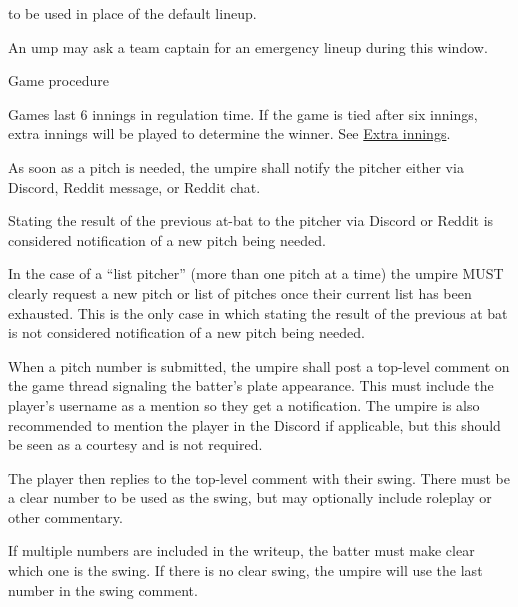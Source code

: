 \begin{deepEnumerate}
\begin{deepEnumerate}
\begin{deepEnumerate}
\begin{deepEnumerate}
				to be used in place of the default lineup.
				\begin{deepEnumerate}
					\item An ump may ask a team captain for an emergency lineup during this window.
				\end{deepEnumerate}
			\end{deepEnumerate}
		\end{deepEnumerate}
	\end{deepEnumerate}
	\item Game procedure
	\begin{deepEnumerate}
		\item Games last 6 innings in regulation time. 
		If the game is tied after six innings, extra innings will be played to determine the winner. 
		See \hyperref[sec:extra innings]{Extra innings}.
		\item As soon as a pitch is needed, the umpire shall notify the pitcher either via Discord, Reddit message, or Reddit chat.
		\begin{deepEnumerate}
			\item Stating the result of the previous at-bat to the pitcher via Discord or Reddit is considered notification of a new 
			pitch being needed.
			\item  In the case of a “list pitcher” (more than one pitch at a time) the umpire MUST clearly request a new pitch or list
			 of pitches once their current list has been exhausted. This is the only case in which stating the result of the previous
			 at bat is not considered notification of a new pitch being needed.
		\end{deepEnumerate}
		\item When a pitch number is submitted, the umpire shall post a top-level comment on the game thread signaling the batter's plate appearance. 
		This must include the player's username as a mention so they get a notification. The umpire is also recommended to mention the player in the Discord if applicable, 
		but this should be seen as a courtesy and is not required.
		\item The player then replies to the top-level comment with their swing. There must be a clear number to be used as the swing, 
		but may optionally include roleplay or other commentary.
		\begin{deepEnumerate}
			\item If multiple numbers are included in the writeup, the batter must make clear which one is the swing. 
			If there is no clear swing, the umpire will use the last number in the swing comment. 

\end{deepEnumerate}
\end{deepEnumerate}
\end{deepEnumerate}
